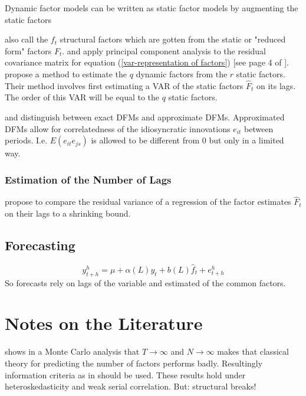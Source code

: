 \documentclass[11pt]{article}
\begin{document}
Dynamic factor models can be written as static factor models by augmenting the static factors

\citet{breitung2004identification} also call the $f_t$ structural factors which are gotten from the static or "reduced form" factors $F_t$.
\citet{giannone2002tracking} and \citet{forni2009opening} apply principal component analysis to the residual covariance matrix for equation (\ref{var-representation of factors}) [see page 4 of \citet{breitung2004identification}]. \citet{bai2007determining} propose a method to estimate the $q$ dynamic factors from the $r$ static factors. Their method involves first estimating a VAR of the static factors $\hat F_t$ on its lags. The order of this VAR will be equal to the $q$ static factors.

\citet{geweke1977dynamic} and \citet{sargent1977business} distinguish between exact DFMs and approximate DFMs. Approximated DFMs allow for correlatedness of the idiosyncratic innovations $e_{it}$ between periods. I.e. $E(e_{it}e_{js})$ is allowed to be different from $0$ but only in a limited way.


\subsubsection{Estimation of the Number of Lags}
\citep{breitung2004identification}

\citet{bai2007determining} propose to compare the residual variance of a regression of the factor estimates $\hat F_t$ on their lags to a shrinking bound.

\subsection{Forecasting}

\begin{equation}
	\label{forecasting equation}
	y_{t+h}^h = \mu + \alpha(L) y_t + b(L) \hat f_t + e_{t+h}^h
\end{equation}
So forecasts rely on lags of the variable and estimated of the common factors.

\section{Notes on the Literature}
\citet{cragg1997inferring} shows in a Monte Carlo analysis that $T\rightarrow\infty$ and $N\rightarrow\infty$ makes that classical theory for predicting the number of factors performs badly. Resultingly information criteria as in \citet{bai2002determining} should be used. These results hold under heteroskedasticity and weak serial correlation. But: structural breaks!
\end{document}
